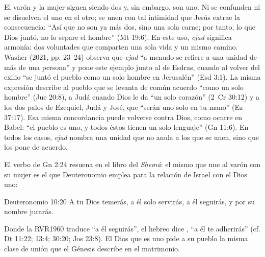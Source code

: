 El varón y la mujer siguen siendo dos y, sin embargo, son uno. Ni se confunden ni se disuelven el uno en el otro; se unen con tal intimidad que Jesús extrae la consecuencia: ``Así que no son ya más dos, sino una sola carne; por tanto, lo que Dios juntó, no lo separe el hombre'' (Mt 19:6). En este uso, \emph{ejad} significa armonía: dos voluntades que comparten una sola vida y un mismo camino. Washer (2021, pp. 23--24) observa que \emph{ejad} ``a menudo se refiere a una unidad de más de una persona'' y pone este ejemplo junto al de Esdras, cuando al volver del exilio ``se juntó el pueblo como un solo hombre en Jerusalén'' (Esd 3:1). La misma expresión describe al pueblo que se levanta de común acuerdo ``como un solo hombre'' (Jue 20:8), a Judá cuando Dios le da ``un solo corazón'' (2~Cr 30:12) y a los dos palos de Ezequiel, Judá y José, que ``serán uno solo en tu mano'' (Ez 37:17). Esa misma concordancia puede volverse contra Dios, como ocurre en Babel: ``el pueblo es uno, y todos éstos tienen un solo lenguaje'' (Gn 11:6). En todos los casos, \emph{ejad} nombra una unidad que no anula a los que se unen, sino que los pone de acuerdo.

El verbo de Gn 2:24 resuena en el libro del \emph{Shemá}: el mismo  que une al varón con su mujer es el que Deuteronomio emplea para la relación de Israel con el Dios uno:

\begin{verso}{Deuteronomio 10:20}
A \SENOR{} tu Dios temerás, a él solo servirás, a él seguirás, y por su nombre jurarás.
\end{verso}

Donde la RVR1960 traduce ``a él seguirás'', el hebreo dice , ``a él te adherirás'' (cf. Dt 11:22; 13:4; 30:20; Jos 23:8). El Dios que es uno pide a su pueblo la misma clase de unión que el Génesis describe en el matrimonio.


